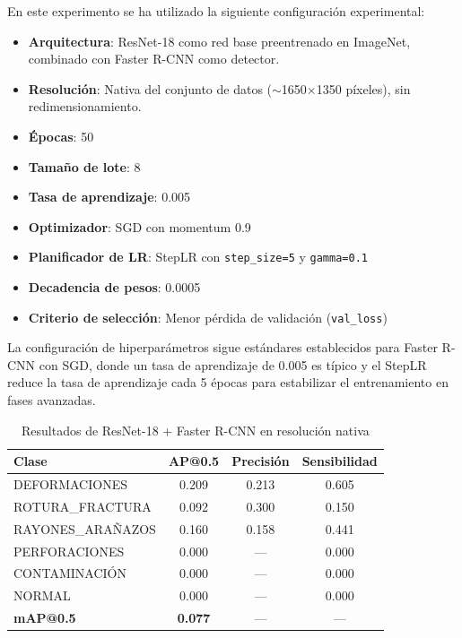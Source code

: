En este experimento se ha utilizado la siguiente configuración experimental:
\begin{itemize}
    \item \textbf{Arquitectura}: ResNet-18 como red base preentrenado en ImageNet, combinado con Faster R-CNN como detector.
    \item \textbf{Resolución}: Nativa del conjunto de datos ($\sim$1650×1350 píxeles), sin redimensionamiento.
    \item \textbf{Épocas}: 50
    \item \textbf{Tamaño de lote}: 8
    \item \textbf{Tasa de aprendizaje}: 0.005
    \item \textbf{Optimizador}: SGD con momentum 0.9
    \item \textbf{Planificador de LR}: StepLR con \texttt{step\_size=5} y \texttt{gamma=0.1}
    \item \textbf{Decadencia de pesos}: 0.0005
    \item \textbf{Criterio de selección}: Menor pérdida de validación (\texttt{val\_loss})
\end{itemize}

La configuración de hiperparámetros sigue estándares establecidos para Faster R-CNN con SGD, donde un tasa de aprendizaje de 0.005 es típico y el StepLR reduce la tasa de aprendizaje cada 5 épocas para estabilizar el entrenamiento en fases avanzadas.

\begin{table}[htbp]
\centering
\begin{tabular}{lccc}
\toprule
\textbf{Clase} & \textbf{AP@0.5} & \textbf{Precisión} & \textbf{Sensibilidad} \\
\midrule
DEFORMACIONES & 0.209 & 0.213 & 0.605 \\
\mbox{ROTURA\_FRACTURA} & 0.092 & 0.300 & 0.150 \\
\mbox{RAYONES\_ARAÑAZOS} & 0.160 & 0.158 & 0.441 \\
PERFORACIONES & 0.000 & --- & 0.000 \\
CONTAMINACIÓN & 0.000 & --- & 0.000 \\
NORMAL & 0.000 & --- & 0.000 \\
\midrule
\textbf{mAP@0.5} & \textbf{0.077} & --- & --- \\
\bottomrule
\end{tabular}
\caption{Resultados de ResNet-18 + Faster R-CNN en resolución nativa}
\label{tab:resnet18_nativa}
\end{table}

